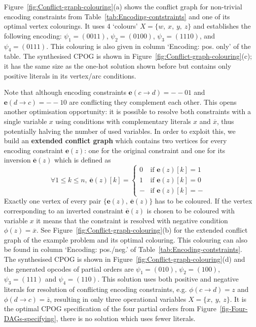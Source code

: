 Figure~\ref{fig:Conflict-graph-colouring}(a) shows the conflict
graph for non-trivial encoding constraints from Table~\ref{tab:Encoding-contstraints}
and one of its optimal vertex colourings. It uses 4 `colours' $X=\{w,\ x,\ y,\ z\}$
and establishes the following encoding: $\psi_{1}=(0011)$, $\psi_{2}=(0100)$,
$\psi_{3}=(1110)$, and $\psi_{4}=(0111)$. This colouring is also
given in column `Encoding: pos. only' of the table. The synthesised
CPOG is shown in Figure~\ref{fig:Conflict-graph-colouring}(c); it
has the same size as the one-hot solution shown before but contains
only positive literals in its vertex/arc conditions.

Note that although encoding constraints $\mathbf{e}(c\rightarrow d)=-\!-\!01$
and $\mathbf{e}(d\rightarrow c)=-\!-\!10$ are conflicting they complement
each other. This opens another optimisation opportunity: it is possible
to resolve both constraints with a single variable $x$ using conditions
with complementary literals $x$ and $\overline{x}$, thus potentially
halving the number of used variables. In order to exploit this, we
build an \textbf{extended conflict graph} which contains two vertices
for every encoding constraint $\mathbf{e}(z)$: one for the original
constraint and one for its inversion $\overline{\mathbf{e}}(z)$ which
is defined as
\[
\forall1\le k\le n,\ \overline{\mathbf{e}}(z)[k]=\begin{cases}
0 & \text{if }\mathbf{e}(z)[k]=1\\
1 & \text{if }\mathbf{e}(z)[k]=0\\
- & \text{if }\mathbf{e}(z)[k]=-
\end{cases}
\]
Exactly one vertex of every pair $\{\mathbf{e}(z),\ \overline{\mathbf{e}}(z)\}$
has to be coloured. If the vertex corresponding to an inverted constraint
$\overline{\mathbf{e}}(z)$ is chosen to be coloured with variable
$x$ it means that the constraint is resolved with negative condition
$\phi(z)=\overline{x}$. See Figure~\ref{fig:Conflict-graph-colouring}(b)
for the extended conflict graph of the example problem and its optimal
colouring. This colouring can also be found in column `Encoding:
pos./neg.' of Table~\ref{tab:Encoding-contstraints}. The synthesised
CPOG is shown in Figure~\ref{fig:Conflict-graph-colouring}(d) and
the generated opcodes of partial orders are $\psi_{1}=(010)$, $\psi_{2}=(100)$,
$\psi_{3}=(111)$ and $\psi_{4}=(110)$. This solution uses both positive
and negative literals for resolution of conflicting encoding constraints,
e.g. $\phi(c\rightarrow d)=z$ and $\phi(d\rightarrow c)=\overline{z}$,
resulting in only three operational variables $X=\{x,\ y,\ z\}$.
It is the optimal CPOG specification of the four partial orders from
Figure~\ref{fig-Four-DAGs-specifying}, there is no solution which
uses fewer literals.

